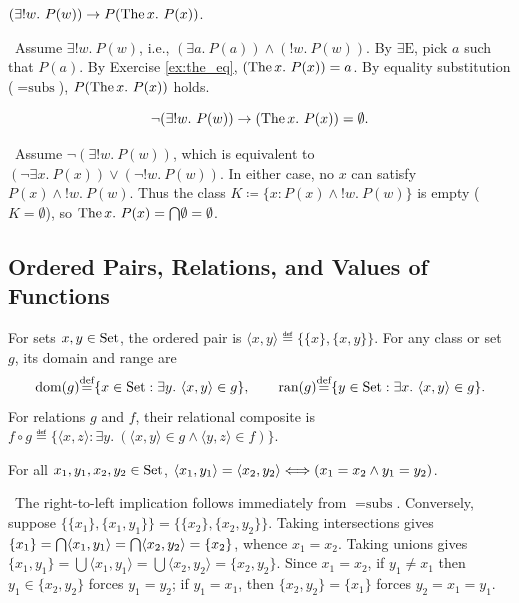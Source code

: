 \documentclass[10pt,a4paper]{article}
\begin{document}
\begin{exercise}\label{ex:the_prop}
$(\exists !w.\ P(w)) \to P(\The x.\ P(x))$.
\end{exercise}
\myprf\ Assume $\exists !w.\ P(w)$, i.e., $(\exists a.\ P(a)) \land (!w.\ P(w))$. By $\exists\textrm{E}$, pick $a$ such that $P(a)$. By Exercise \ref{ex:the_eq}, $({\textrm{The\,}} x.\ P(x)) = a$. By equality substitution ($=\textrm{subs}$), $P({\textrm{The\,}} x.\ P(x))$ holds. \myqed

\begin{lemma}\label{lem:the_default}
$$\neg (\exists !w.\ P(w)) \to ({\textrm{The\,}} x.\ P(x)) = \emptyset.$$
\end{lemma}
\myprf\ Assume $\neg (\exists !w.\ P(w))$, which is equivalent to $(\neg \exists x.\ P(x)) \lor (\neg !w.\ P(w))$. In either case, no $x$ can satisfy $P(x) \land !w.\ P(w)$. Thus the class $K \coloneqq \{x : P(x) \land !w.\ P(w)\}$ is empty ($K = \emptyset$), so ${\textrm{The\,}} x.\ P(x) = {\bigcap} \emptyset = \emptyset$. \myqed

\subsection{Ordered Pairs, Relations, and Values of Functions}
\begin{definition}\label{def:pair_rel}
For sets $x, y \in {\textrm{Set}}$, the ordered pair is $\langle x, y \rangle \eqdef \{\{x\}, \{x, y\}\}$. For any class or set $g$, its domain and range are
$${\textrm{dom}}(g) {\stackrel{{\textrm{def}}}{=}} \{x \in {\textrm{Set}} : \exists y.\ \langle x, y \rangle \in g\}, \qquad \textrm{ran}(g) {\stackrel{{\textrm{def}}}{=}} \{y \in {\textrm{Set}} : \exists x.\ \langle x, y \rangle \in g\}.$$
For relations $g$ and $f$, their relational composite is $f \circ g \eqdef \{\langle x, z \rangle : \exists y.\ (\langle x, y \rangle \in g \land \langle y, z \rangle \in f)\}$.
\end{definition}

\begin{lemma}\label{lem:pair_prop}
For all $x_1, y_1, x_2, y_2 \in {\textrm{Set}}$, $\langle x_1, y_1 \rangle = \langle x_2, y_2 \rangle \Longleftrightarrow (x_1 = x_2 \land y_1 = y_2)$.
\end{lemma}
\myprf\ The right-to-left implication follows immediately from $=\textrm{subs}$. Conversely, suppose $\{\{x_1\}, \{x_1, y_1\}\} = \{\{x_2\}, \{x_2, y_2\}\}$. Taking intersections gives $\{x_1\} = {\bigcap} \langle x_1, y_1 \rangle = {\bigcap} \langle x_2, y_2 \rangle = \{x_2\}$, whence $x_1 = x_2$. Taking unions gives $\{x_1, y_1\} = \bigcup \langle x_1, y_1 \rangle = \bigcup \langle x_2, y_2 \rangle = \{x_2, y_2\}$. Since $x_1 = x_2$, if $y_1 \neq x_1$ then $y_1 \in \{x_2, y_2\}$ forces $y_1 = y_2$; if $y_1 = x_1$, then $\{x_2, y_2\} = \{x_1\}$ forces $y_2 = x_1 = y_1$. \myqed
\end{document}
